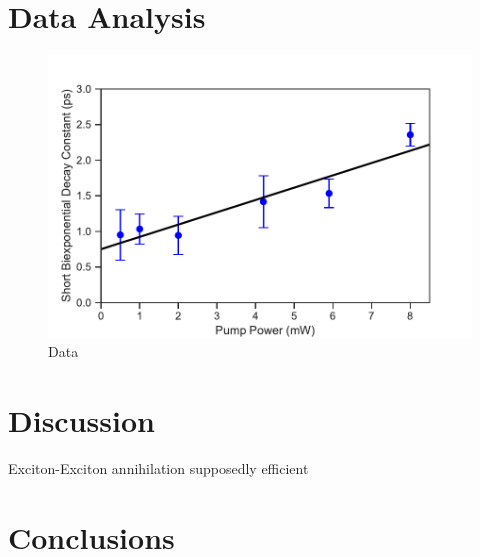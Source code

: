 \section{Data Analysis}
\begin{figure}[H]
	\centering
	\includegraphics[scale=0.8]{images/chapter_my_data/shorter_biexpconst_fit}
	\caption{Data}
\end{figure}

\section{Discussion}
Exciton-Exciton annihilation supposedly efficient \cite{murakami2009existence}


\section{Conclusions}